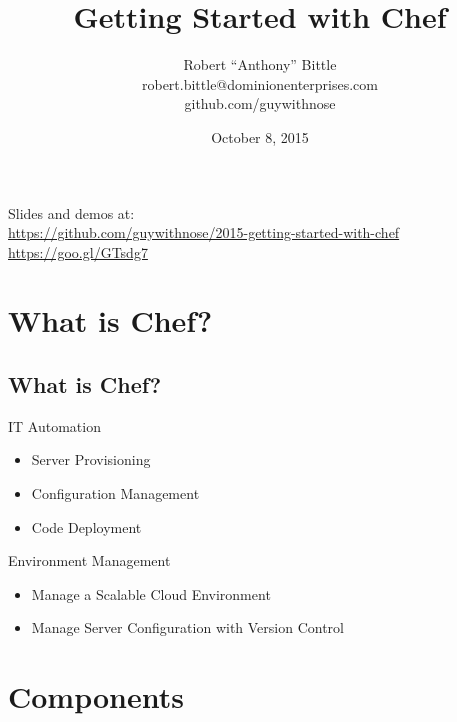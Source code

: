 \documentclass{beamer}
\title[Getting Started with Chef]{Getting Started with Chef}
\author{\hspace{12pt}Robert “Anthony” Bittle\hspace{12pt}\\\hspace{12pt}robert.bittle@dominionenterprises.com\hspace{12pt}\\\hspace{12pt}github.com/guywithnose\hspace{12pt}}
\date{October 8, 2015}
\begin{document}
    \begin{frame}
        \titlepage
        Slides and demos at:\\
        \href{https://github.com/guywithnose/2015-getting-started-with-chef}{https://github.com/guywithnose/2015-getting-started-with-chef}
        \href{https://goo.gl/GTsdg7}{https://goo.gl/GTsdg7}
    \end{frame}

    \section{What is Chef?}
    \subsection{What is Chef?}
    \begin{frame}{IT Automation}
        \begin{itemize}
            \item Server Provisioning
            \item Configuration Management
            \item Code Deployment
        \end{itemize}
    \end{frame}
    \begin{frame}{Environment Management}
        \begin{itemize}
            \item Manage a Scalable Cloud Environment
            \item Manage Server Configuration with Version Control
        \end{itemize}
    \end{frame}
    \section{Components}
\end{document}
